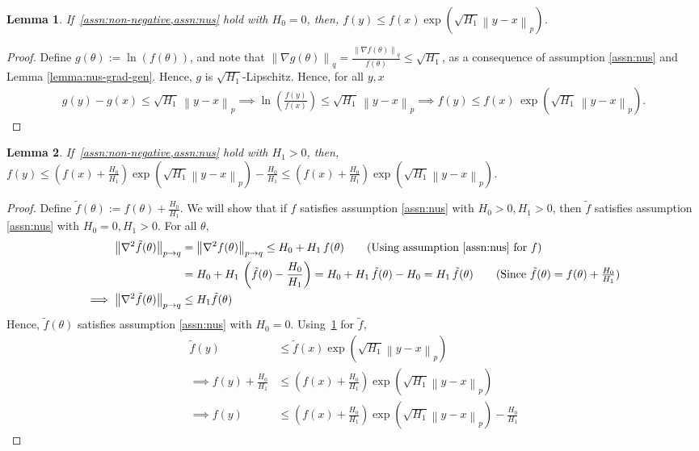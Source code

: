 \documentclass{article}
\newtheorem{lemma}{Lemma}
\newcommand{\norm}[1]{\left\|#1 \right\|}
\begin{document}
\begin{lemma}
If~\cref{assn:non-negative,assn:nus} hold with $H_0 = 0$, then, $f(y) \leq f(x) \exp\left(\sqrt{H_1} \norm{y - x}_p \right)$.     
\label{lemma:func-multi-lip}
\end{lemma}
\begin{proof}
Define $g(\theta) := \ln(f(\theta))$, and note that $\norm{\nabla g(\theta)}_q = \frac{\norm{\nabla f(\theta)}_{q}}{f(\theta)} \leq \sqrt{H_1}$, as a consequence of assumption \ref{assn:nus} and Lemma \ref{lemma:nus-grad-gen}. Hence, $g$ is $\sqrt{H_1}$-Lipschitz. Hence, for all  $y, x$
\begin{align*}
g(y) - g(x) \leq \sqrt{H_1} \, \norm{y - x}_{p} \implies \ln\left(\frac{f(y)}{f(x)}\right) \leq \sqrt{H_1} \, \norm{y - x}_p \implies f(y) \leq f(x) \, \exp\left( \sqrt{H_1} \, \norm{y - x}_p \right).  
\end{align*}
\end{proof}

\begin{lemma}
If~\cref{assn:non-negative,assn:nus} hold with $H_1 > 0$, then, $f(y) \leq \left(f(x) + \frac{H_0}{H_1}\right) \exp\left(\sqrt{H_1} \norm{y - x}_p \right) - \frac{H_0}{H_1} \leq \left(f(x) + \frac{H_0}{H_1}\right) \exp\left(\sqrt{H_1} \norm{y - x}_p \right)$.     
\label{lemma:func-multi-lip-gen}
\end{lemma}
\begin{proof}
Define $\tilde{f}(\theta):= f(\theta) + \frac{H_0}{H_1}$. We will show that if $f$ satisfies assumption \ref{assn:nus} with $H_0 > 0, H_1 > 0$, then $\tilde{f}$ satisfies assumption \ref{assn:nus} with $H_0 = 0, H_1 > 0$. For all $\theta$, 
\begin{align*}
\norm{\nabla^2 \tilde{f}(\theta)}_{p \to q} &= \norm{\nabla^2 f(\theta)}_{p \to q} \leq H_0 + H_1 \, f(\theta) \tag{Using assumption \ref{assn:nus} for $f$} \\
& = H_0 + H_1 \, \left( \tilde{f}(\theta) - \frac{H_0}{H_1} \right) = H_0 + H_1 \, \tilde{f}(\theta) - H_0 = H_1 \, \tilde{f}(\theta) \tag{Since $\tilde{f}(\theta) = f(\theta) + \frac{H_0}{H_1}$} \\
\implies \norm{\nabla^2 \tilde{f}(\theta)}_{p \to q} & \leq H_1 \tilde{f}(\theta)
\end{align*}
Hence, $\tilde{f}(\theta)$ satisfies assumption \ref{assn:nus} with $H_0 = 0$. Using~\cref{lemma:func-multi-lip} for $\tilde{f}$, 
\begin{align*}
\tilde{f}(y) & \leq \tilde{f}(x) \exp\left(\sqrt{H_1} \norm{y - x}_p \right) \\
\implies f(y) + \frac{H_0}{H_1} & \leq \left(f(x) + \frac{H_0}{H_1}\right) \exp\left(\sqrt{H_1} \norm{y - x}_p \right) \\
\implies f(y) & \leq \left(f(x) + \frac{H_0}{H_1}\right) \exp\left(\sqrt{H_1} \norm{y - x}_p \right) - \frac{H_0}{H_1}
\end{align*}
\end{proof}
\end{document}
